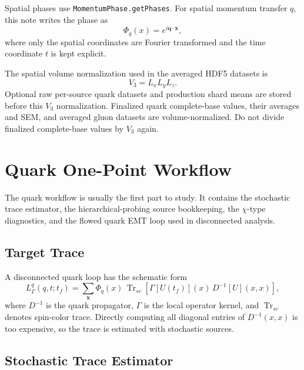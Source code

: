 \documentclass[11pt,a4paper]{article}
\newcommand{\code}[1]{\texttt{\begingroup\def\_{\textunderscore\allowbreak}#1\endgroup}}
\newcommand{\Trsc}{\operatorname{Tr}_{sc}}
\newcommand{\Vthree}{V_3}
\newcommand{\Tf}{t_f}
\begin{document}
Spatial phases use \code{MomentumPhase.getPhases}. For spatial momentum
transfer \(q\), this note writes the phase as
\begin{equation}
  \Phi_q(x) = e^{i\mathbf{q}\cdot\mathbf{x}},
\end{equation}
where only the spatial coordinates are Fourier transformed and the time
coordinate \(t\) is kept explicit.

The spatial volume normalization used in the averaged HDF5 datasets is
\begin{equation}
  \Vthree = L_x L_y L_z.
\end{equation}
Optional raw per-source quark datasets and production shard means are stored
before this \(\Vthree\) normalization. Finalized quark complete-base values,
their averages and SEM, and averaged gluon datasets are volume-normalized.
Do not divide finalized complete-base values by \(\Vthree\) again.

\section{Quark One-Point Workflow}

The quark workflow is usually the first part to study.  It contains the
stochastic trace estimator, the hierarchical-probing source bookkeeping, the
\(\chi\)-type diagnostics, and the flowed quark EMT loop used in disconnected
analysis.

\subsection{Target Trace}

A disconnected quark loop has the schematic form
\begin{equation}
  L^q_{\Gamma}(q,t;\Tf)
  =
  \sum_{\mathbf{x}} \Phi_q(x)\,
  \Trsc\!\left[
    \Gamma[U(\Tf)](x)\,D^{-1}[U](x,x)
  \right],
  \label{eq:generic_trace}
\end{equation}
where \(D^{-1}\) is the quark propagator, \(\Gamma\) is the local operator
kernel, and \(\Trsc\) denotes spin-color trace.  Directly computing all diagonal
entries of \(D^{-1}(x,x)\) is too expensive, so the trace is estimated with
stochastic sources.

\subsection{Stochastic Trace Estimator}
\end{document}

